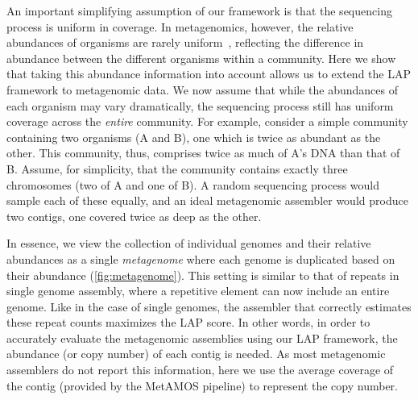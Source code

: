 An important simplifying assumption of our framework is that the sequencing process is uniform in coverage.
In metagenomics, however, the relative abundances of organisms are rarely uniform~\cite{carrigg2007dna,krsek1999comparison,morgan2010metagenomic,temperton2009bias}, reflecting the difference in abundance between the different organisms within a community.
Here we show that taking this abundance information into account allows us to extend the LAP framework to metagenomic data.
We now assume that while the abundances of each organism may vary dramatically, the sequencing process still has uniform coverage across the \emph{entire} community.
For example, consider a simple community containing two organisms (A and B), one which is twice as abundant as the other.
This community, thus, comprises twice as much of A's DNA than that of B.
Assume, for simplicity, that the community contains exactly three chromosomes (two of A and one of B).
A random sequencing process would sample each of these equally, and an ideal metagenomic assembler would produce two contigs, one covered twice as deep as the other.



In essence, we view the collection of individual genomes and their relative abundances as a single \emph{metagenome} where each genome is duplicated based on their abundance (\figurename \ref{fig:metagenome}).
This setting is similar to that of repeats in single genome assembly, where a repetitive element can now include an entire genome.
Like in the case of single genomes, the assembler that correctly estimates these repeat counts maximizes the LAP score.
In other words, in order to accurately evaluate the metagenomic assemblies using our LAP framework, the abundance (or copy number) of each contig is needed.
As most metagenomic assemblers do not report this information, 
here we use the average coverage of the contig (provided by the MetAMOS pipeline) to represent the copy number.

